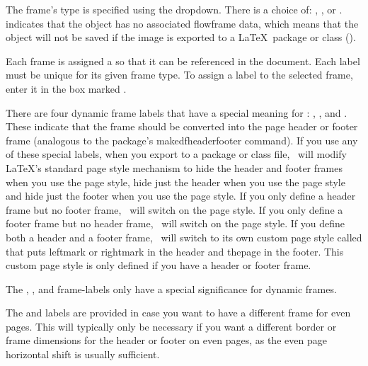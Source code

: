 The frame's type is specified using the 
 \gls*{dropdown}. There is a choice of:
, ,
 or .
 indicates that the \gls{object} has
no associated flowframe data, which means that the object will not
be saved if the image is exported to a \LaTeX\ package or
class ().


Each frame is assigned a  so that it can be referenced in the
document. Each label must be unique for its given frame type.  To
assign a label to the selected frame, enter it in the box
marked .

There are four dynamic frame labels that have a special meaning for
\FlowframTk: ,
,
 and
. These indicate that the frame should be converted
into the page header or footer frame (analogous to the
 package's \gls{makedfheaderfooter} command).
If you use any of these special labels, when you export to a package or
class file, \FlowframTk\ will modify \LaTeX's standard page style
mechanism to hide the header and footer frames when you use the
 page style, hide just the header when you use the
 page style and hide just the footer when you use the
 page style. If you only define a header frame but
no footer frame, \FlowframTk\ will switch on the 
page style. If you only define a footer frame but no header frame,
\FlowframTk\ will switch on the  page style. If you
define both a header and a footer frame, \FlowframTk\ will switch to
its own custom page style called  that puts
\gls{leftmark} or \gls{rightmark} in the header and
\gls{thepage} in the footer. This custom page style is
only defined if you have a header or footer frame.

\begin{important}
The , ,
 and  
\glspl{frame-label} only have a special significance for dynamic frames.
\end{important}

The  and  labels are provided
in case you want to have a different frame for even pages. This will
typically only be necessary if you want a different border or frame
dimensions for the header or footer on even pages, as the
even page horizontal shift is usually sufficient.

